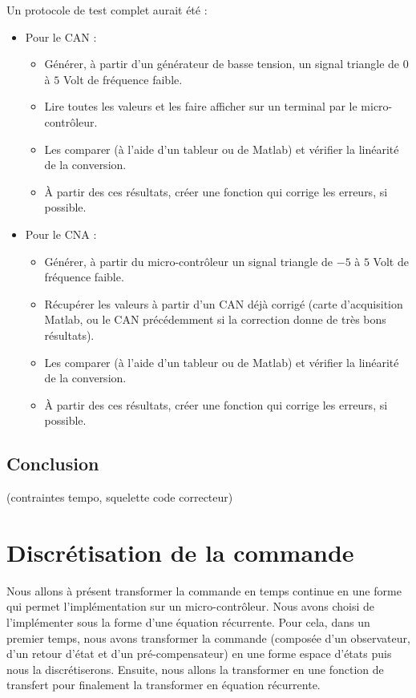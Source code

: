Un protocole de test complet aurait été :\\
\begin{itemize}
\item Pour le CAN : 
	\begin{itemize}
		\item Générer, à partir d'un générateur de basse tension, un signal triangle de $0$ à $5$ Volt de fréquence faible.
		\item Lire toutes les valeurs et les faire afficher sur un terminal par le micro-contrôleur.
		\item Les comparer (à l'aide d'un tableur ou de Matlab) et vérifier la linéarité de la conversion.
		\item À partir des ces résultats, créer une fonction qui corrige les erreurs, si possible.
	\end{itemize}

\item Pour le CNA :
	\begin{itemize}
		\item Générer, à partir du micro-contrôleur un signal triangle de $-5$ à $5$ Volt de fréquence faible.
		\item Récupérer les valeurs à partir d'un CAN déjà corrigé (carte d'acquisition Matlab, ou le CAN précédemment si la correction donne de très bons résultats).
		\item Les comparer (à l'aide d'un tableur ou de Matlab) et vérifier la linéarité de la conversion.
		\item À partir des ces résultats, créer une fonction qui corrige les erreurs, si possible.
	\end{itemize}
\end{itemize}

	\subsection{Conclusion}
	  	(contraintes tempo, squelette code correcteur)
	  	
	  	
	  	

\section{Discrétisation de la commande}
Nous allons à présent transformer la commande en temps continue en une forme qui permet l'implémentation sur un micro-contrôleur. Nous avons choisi de l'implémenter sous la forme d'une équation récurrente. Pour cela, dans un premier temps, nous avons transformer la commande (composée d'un observateur, d'un retour d'état et d'un pré-compensateur) en une forme espace d'états puis nous la discrétiserons. Ensuite, nous allons la transformer en une fonction de transfert pour finalement la transformer en équation récurrente.
